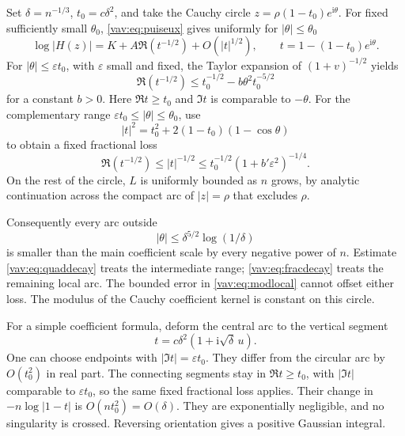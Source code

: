 \documentclass[11pt]{article}
\theoremstyle{remark}\newtheorem{remark}[theorem]{Remark}
\newcommand{\ii}{\mathrm i}
\begin{document}
Set $\delta=n^{-1/3}$, $t_0=c\delta^2$, and take the Cauchy circle
$z=\rho(1-t_0)e^{\ii\theta}$. For fixed sufficiently small $\theta_0$,
\eqref{vav:eq:puiseux} gives uniformly for $|\theta|\le\theta_0$
\begin{equation}\label{vav:eq:modlocal}
 \log|H(z)|=K+A\Re(t^{-1/2})+O(|t|^{1/2}),\qquad
 t=1-(1-t_0)e^{\ii\theta}.
\end{equation}
For $|\theta|\le\varepsilon t_0$, with $\varepsilon$ small and fixed,
the Taylor expansion of $(1+v)^{-1/2}$ yields
\begin{equation}\label{vav:eq:quaddecay}
 \Re(t^{-1/2})\le t_0^{-1/2}-b\theta^2t_0^{-5/2}
\end{equation}
for a constant $b>0$. Here $\Re t\ge t_0$ and $\Im t$ is comparable
to $-\theta$. For the complementary range
$\varepsilon t_0\le|\theta|\le\theta_0$, use
\[
 |t|^2=t_0^2+2(1-t_0)(1-\cos\theta)
\]
to obtain a fixed fractional loss
\begin{equation}\label{vav:eq:fracdecay}
 \Re(t^{-1/2})\le |t|^{-1/2}
       \le t_0^{-1/2}(1+b'\varepsilon^2)^{-1/4}.
\end{equation}
On the rest of the circle, $L$ is uniformly bounded as $n$ grows,
by analytic continuation across the compact arc of $|z|=\rho$
that excludes $\rho$.

Consequently every arc outside
\begin{equation}\label{vav:eq:window}
 |\theta|\le\delta^{5/2}\log(1/\delta)
\end{equation}
is smaller than the main coefficient scale by every negative power
of $n$. Estimate \eqref{vav:eq:quaddecay} treats the intermediate range;
\eqref{vav:eq:fracdecay} treats the remaining local arc. The bounded error
in \eqref{vav:eq:modlocal} cannot offset either loss. The modulus of the
Cauchy coefficient kernel is constant on this circle.

For a simple coefficient formula, deform the central arc to the vertical
segment
\begin{equation}\label{vav:eq:vertical}
 t=c\delta^2(1+\ii\sqrt\delta\,u).
\end{equation}
One can choose endpoints with $|\Im t|=\varepsilon t_0$.
They differ from the circular arc by $O(t_0^2)$ in real part. The
connecting segments stay in $\Re t\ge t_0$, with $|\Im t|$ comparable
to $\varepsilon t_0$, so the same fixed fractional loss applies.
Their change in $-n\log|1-t|$ is $O(nt_0^2)=O(\delta)$.
They are exponentially negligible, and no singularity is crossed.
Reversing orientation gives a positive Gaussian integral.
\end{document}
